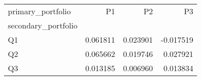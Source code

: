 \begin{tabular}{lrrr}
\toprule
primary_portfolio & P1 & P2 & P3 \\
secondary_portfolio &  &  &  \\
\midrule
Q1 & 0.061811 & 0.023901 & -0.017519 \\
Q2 & 0.065662 & 0.019746 & 0.027921 \\
Q3 & 0.013185 & 0.006960 & 0.013834 \\
\bottomrule
\end{tabular}
